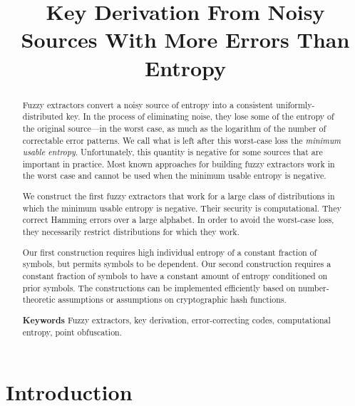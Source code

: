 \documentclass[11pt]{article}
\title{Key Derivation From Noisy Sources With More Errors Than Entropy}
\begin{document}
\maketitle


\begin{abstract}
Fuzzy extractors convert a noisy source of entropy into a consistent uniformly-distributed key.  In the process of eliminating noise, they  lose some of the entropy of the original source---in the worst case, as much as the logarithm of the number of correctable error patterns. We call what is left after this worst-case loss the \emph{minimum usable entropy}.  Unfortunately, this quantity is negative for some sources that are important in practice. Most known approaches for building fuzzy extractors work in the worst case and cannot be used when the minimum usable entropy is negative.

We construct the first fuzzy extractors that work for a large class of distributions in which the minimum usable entropy is negative. Their security is computational.  They correct Hamming errors over a large alphabet. In order to avoid the worst-case loss, they necessarily restrict distributions for which they work.  

Our first construction requires high individual entropy of a constant fraction of symbols, but permits symbols to be dependent.  Our second construction requires  a constant fraction of symbols to have a constant amount of entropy conditioned on prior symbols. The constructions can be implemented efficiently based on number-theoretic assumptions or assumptions on cryptographic hash functions.


\textbf{Keywords} Fuzzy extractors, key derivation, error-correcting codes, computational entropy, point obfuscation.
\end{abstract}


\section{Introduction}\label{sec:introduction}
\end{document}
